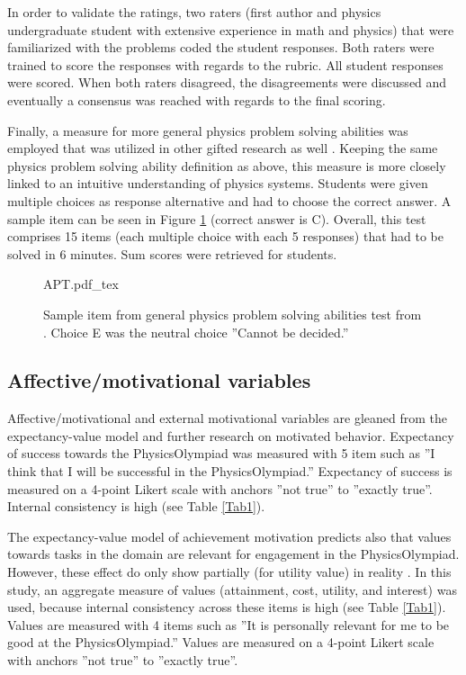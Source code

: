 \documentclass[]{interact}
\begin{document}
In order to validate the ratings, two raters (first author and physics undergraduate student with extensive experience in math and physics) that were familiarized with the problems coded the student responses. Both raters were trained to score the responses with regards to the rubric. All student responses were scored. When both raters disagreed, the disagreements were discussed and eventually a consensus was reached with regards to the final scoring.



Finally, a measure for more general physics problem solving abilities was employed that was utilized in other gifted research as well \cite{Heller.2007}. Keeping the same physics problem solving ability definition as above, this measure is more closely linked to an intuitive understanding of physics systems. Students were given multiple choices as response alternative and had to choose the correct answer. A sample item can be seen in Figure \ref{APT} (correct answer is C). Overall, this test comprises 15 items (each multiple choice with each 5 responses) that had to be solved in 6 minutes. Sum scores were retrieved for students.

\begin{figure}
\centering
{APT.pdf_tex}
\caption{Sample item from general physics problem solving abilities test from \cite{Heller.2007}. Choice E was the neutral choice ''Cannot be decided.''}
\label{APT}
\end{figure}

\subsection{Affective/motivational variables} 

Affective/motivational and external motivational variables are gleaned from the expectancy-value model and further research on motivated behavior. Expectancy of success towards the PhysicsOlympiad was measured with 5 item such as ''I think that I will be successful in the PhysicsOlympiad.'' Expectancy of success is measured on a 4-point Likert scale with anchors ''not true'' to ''exactly true''. Internal consistency is high (see Table \ref{Tab1}). 

The expectancy-value model of achievement motivation predicts also that values towards tasks in the domain are relevant for engagement in the PhysicsOlympiad. However, these effect do only show partially (for utility value) in reality \citep{Urhahne.2012}. In this study, an aggregate measure of values (attainment, cost, utility, and interest) was used, because internal consistency across these items is high (see Table \ref{Tab1}). Values are measured with 4 items such as ''It is personally relevant for me to be good at the PhysicsOlympiad.'' Values are measured on a 4-point Likert scale with anchors ''not true'' to ''exactly true''.
\end{document}
